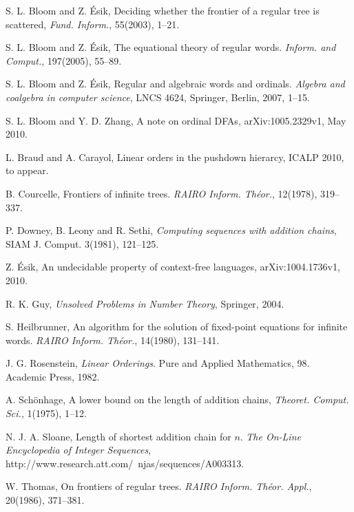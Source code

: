 \documentclass[copyright]{eptcs}
\begin{document}
\begin{thebibliography}{nn}




S. L. Bloom and  Z. \'Esik,
Deciding whether the frontier of a regular tree is scattered,
\emph{Fund. Inform.}, 55(2003), 1--21. 

S. L. Bloom and  Z. \'Esik, 
The equational theory of regular words.  
{\em Inform. and Comput.},  197(2005), 55--89.


S. L. Bloom and Z. \'Esik, 
 Regular and algebraic words and ordinals.  
{\em Algebra and coalgebra in computer science},
LNCS 4624, Springer, Berlin, 2007,  1--15. 

S. L. Bloom and  Y. D.  Zhang,
A note on ordinal DFAs, arXiv:1005.2329v1, May 2010. 

L. Braud and A. Carayol,
Linear orders in the pushdown hierarcy, ICALP 2010, to appear. 

B. Courcelle, Frontiers of infinite trees.  
{\em RAIRO Inform. Th\'eor.},  12(1978), 319--337.

P. Downey, B. Leony and R. Sethi, \emph{Computing sequences
with addition chains}, SIAM J. Comput. 3(1981),  121--125.

Z. \'Esik, An undecidable property of context-free languages,
arXiv:1004.1736v1, 2010.

R. K. Guy, \emph{Unsolved Problems in Number Theory}, Springer, 2004. 

S. Heilbrunner,  An algorithm for the solution of fixed-point equations for infinite words.  
{\em RAIRO Inform. Th\'eor.},  14(1980), 131--141.

J. G. Rosenstein, {\em Linear Orderings}. Pure and Applied Mathematics, 98. Academic Press, 
1982.

A. Sch\"onhage,  A lower bound on the length of addition chains,
\emph{Theoret. Comput. Sci.}, 1(1975), 1--12. 

N. J. A. Sloane, Length of shortest addition chain for $n$.
\emph{ The On-Line Encyclopedia of Integer Sequences},
http://www.research.att.com/~njas/sequences/A003313.


W. Thomas, On frontiers of regular trees.  
{\em RAIRO Inform. Th\'eor. Appl.},  20(1986), 371--381.


\end{thebibliography}
\end{document}

